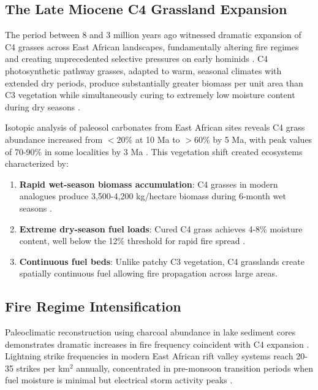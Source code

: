 \subsection{The Late Miocene C4 Grassland Expansion}

The period between 8 and 3 million years ago witnessed dramatic expansion of C4 grasses across East African landscapes, fundamentally altering fire regimes and creating unprecedented selective pressures on early hominids \citep{cerling1997global,kingston2007shifting}. C4 photosynthetic pathway grasses, adapted to warm, seasonal climates with extended dry periods, produce substantially greater biomass per unit area than C3 vegetation while simultaneously curing to extremely low moisture content during dry seasons \citep{edwards2010trajectory}.

Isotopic analysis of paleosol carbonates from East African sites reveals C4 grass abundance increased from $<20\%$ at 10 Ma to $>60\%$ by 5 Ma, with peak values of 70-90\% in some localities by 3 Ma \citep{cerling2011woody}. This vegetation shift created ecosystems characterized by:

\begin{enumerate}
\item \textbf{Rapid wet-season biomass accumulation}: C4 grasses in modern analogues produce 3,500-4,200 kg/hectare biomass during 6-month wet seasons \citep{scholes2008tree}.
\item \textbf{Extreme dry-season fuel loads}: Cured C4 grass achieves 4-8\% moisture content, well below the 12\% threshold for rapid fire spread \citep{trollope2004fire}.
\item \textbf{Continuous fuel beds}: Unlike patchy C3 vegetation, C4 grasslands create spatially continuous fuel allowing fire propagation across large areas.
\end{enumerate}

\subsection{Fire Regime Intensification}

Paleoclimatic reconstruction using charcoal abundance in lake sediment cores demonstrates dramatic increases in fire frequency coincident with C4 expansion \citep{bobe2002faunal,bonnefille2010cenozoic}. Lightning strike frequencies in modern East African rift valley systems reach 20-35 strikes per km$^2$ annually, concentrated in pre-monsoon transition periods when fuel moisture is minimal but electrical storm activity peaks \citep{christian2003global}.

